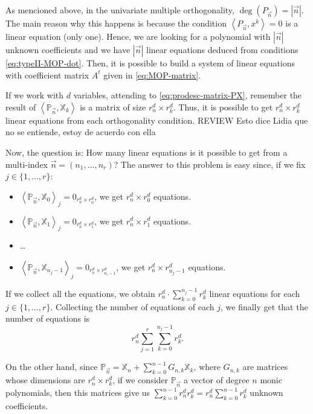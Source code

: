 \documentclass[12pt,a4]{article}
\theoremstyle{plain}
\newcommand{\cred}[1]{{\color{red} #1}}
\newcommand{\prodesc}[2]{\left\langle #1 , #2 \right\rangle}
\begin{document}
As mencioned above, in the univariate multiple orthogonality, $\deg(P_{\vec n})=|\vec n|$. The main reason why this happens is because the condition $\prodesc{P_{\vec n}}{x^k}=0$ is a linear equation (only one). Hence, we are looking for a polynomial with $|\vec n|$ unknown coefficients and we have $|\vec n|$ linear equations deduced from conditions \eqref{eq:typeII-MOP-dot}. Then, it is possible to build a system of linear equations with coefficient matrix $A^t$ given in \eqref{eq:MOP-matrix}.

If we work with $d$ variables, attending to \eqref{eq:prodesc-matrix-PX}, remember the result of $\prodesc{\mathbb P_{\vec n}}{\mathbb X_k}$ is a matrix of size $r_n^d\times r_k^d$. Thus, it is possible to get $r_n^d\times r_k^d$ linear equations from each orthogonality condition.  
\cred{REVIEW Esto dice Lidia que no se entiende, estoy de acuerdo con ella}

Now, the question is: How many linear equations is it possible to get from a multi-index $\vec n =(n_1, \dots, n_r)$? The answer to this problem is easy since, if we fix $j\in\{1,\dots,r\}$:
\begin{itemize}
    \item $\prodesc{\mathbb P_{\vec n}}{\mathbb X_0}_j = 0_{r^d_n\times r^d_0}$, we get $r^d_n\times r^d_0$ equations.
    \item $\prodesc{\mathbb P_{\vec n}}{\mathbb X_1}_j = 0_{r^d_n\times r^d_1}$, we get $r^d_n\times r^d_1$ equations.
    \item \dots
    \item $\prodesc{\mathbb P_{\vec n}}{\mathbb X_{n_j-1}}_j = 0_{r^d_n\times r^d_{n_i-1}}$, we get $r^d_n\times r^d_{n_j-1}$ equations.
\end{itemize} 
If we collect all the equations, we obtain $r_n^d\cdot\displaystyle\sum_{k=0}^{n_j-1}r^d_k$ linear equations for each $j\in\{1,\dots,r\}$. Collecting the number of equations of each $j$, we finally get that the number of equations is 
\begin{equation}
    \label{eq:number-eqs}
    r_n^d \sum_{j=1}^r \sum_{k=0}^{n_j-1} r_k^d.
\end{equation}

On the other hand, since $\mathbb P_{\vec n} = \mathbb X_n + \displaystyle\sum_{k=0}^{n-1}G_{n,k} \mathbb X_k$, where $G_{n,k}$ are matrices whose dimensions are $r^d_n\times r^d_k$, if we consider $\mathbb P_{\vec n}$ a vector of degree $n$ monic polynomials, then this matrices give us $\displaystyle\sum_{k=0}^{n-1}r^d_n r^d_k=r^d_n\displaystyle\sum_{k=0}^{n-1} r^d_k$ unknown coefficients.
\end{document}
